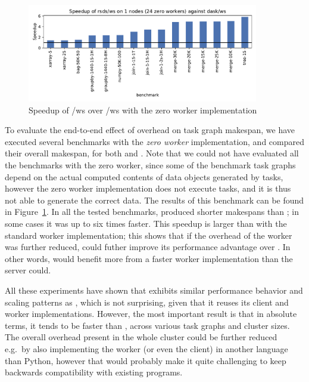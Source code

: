 \begin{figure}
	\centering
	\includegraphics[width=0.9\textwidth]{./imgs/rsds/charts/speedup-zw-rsds-ws-1}
	\caption{Speedup of \rsds{}/ws over \dask{}/ws with the zero worker
	implementation}
	\label{fig:rsds-zero-worker-speedup}
\end{figure}

To evaluate the end-to-end effect of overhead on task graph makespan, we have executed several
benchmarks with the \emph{zero worker} implementation, and compared their overall
makespan, for both \dask{} and \rsds{}. Note that we could
not have evaluated all the benchmarks with the zero worker, since some of the benchmark task graphs
depend on the actual computed contents of data objects generated by tasks, however the zero worker
implementation does not execute tasks, and it is thus not able to generate the correct data. The
results of this benchmark can be found in Figure~\ref{fig:rsds-zero-worker-speedup}. In all the tested
benchmarks, \rsds{} produced shorter makespans than
\dask{}; in some cases it was up to six times faster. This speedup is larger
than with the standard worker implementation; this shows that if the overhead of the worker was
further reduced, \rsds{} could futher improve its performance advantage over
\dask{}. In other words, \rsds{} would benefit more from a
faster worker implementation than the \dask{} server could.

All these experiments have shown that \rsds{} exhibits similar performance
behavior and scaling patterns as \dask{}, which is not surprising, given that
it reuses its client and worker implementations. However, the most important result is that in
absolute terms, it tends to be faster than \dask{}, across various task graphs
and cluster sizes. The overall overhead present in the whole \rsds{} cluster
could be further reduced e.g.\ by also implementing the worker (or even the client) in another
language than Python, however that would probably make it quite challenging to keep backwards
compatibility with existing \dask{} programs.

